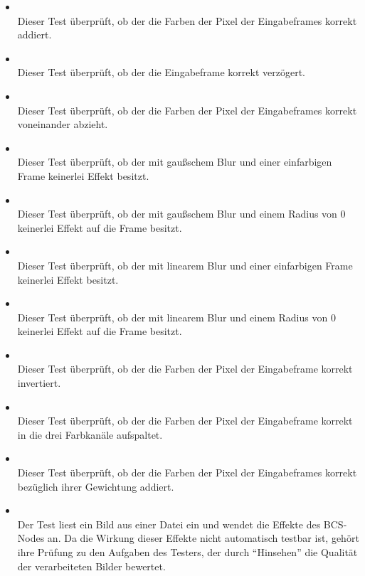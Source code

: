 \begin{itemize}

\item{}~\\
Dieser Test überprüft, ob der  die Farben der Pixel der Eingabeframes korrekt addiert.

\item{}~\\
Dieser Test überprüft, ob der  die Eingabeframe korrekt verzögert.

\item{}~\\
Dieser Test überprüft, ob der  die Farben der Pixel der Eingabeframes korrekt voneinander abzieht.

\item{}~\\
Dieser Test überprüft, ob der  mit gaußschem Blur und einer einfarbigen Frame keinerlei Effekt besitzt.

\item{}~\\
Dieser Test überprüft, ob der  mit gaußschem Blur und einem Radius von 0 keinerlei Effekt auf die Frame besitzt.

\item{}~\\
Dieser Test überprüft, ob der  mit linearem Blur und einer einfarbigen Frame keinerlei Effekt besitzt.

\item{}~\\
Dieser Test überprüft, ob der  mit linearem Blur und einem Radius von 0 keinerlei Effekt auf die Frame besitzt.

\item{}~\\
Dieser Test überprüft, ob der  die Farben der Pixel der Eingabeframe korrekt invertiert.

\item{}~\\
Dieser Test überprüft, ob der  die Farben der Pixel der Eingabeframe korrekt in die drei Farbkanäle aufspaltet.

\item{}~\\
Dieser Test überprüft, ob der  die Farben der Pixel der Eingabeframes korrekt bezüglich ihrer Gewichtung addiert.

\item{}~\\
Der Test liest ein Bild aus einer Datei ein und wendet die Effekte des BCS-Nodes an. Da die Wirkung dieser Effekte nicht automatisch testbar ist, gehört ihre Prüfung zu den Aufgaben des Testers, der durch ``Hinsehen'' die Qualität der verarbeiteten Bilder bewertet.

\end{itemize}

